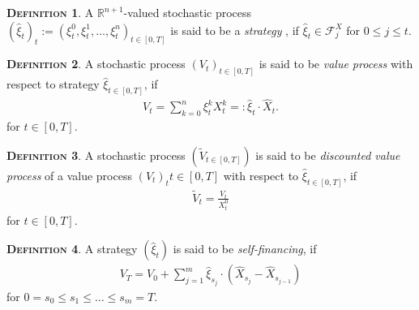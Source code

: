 \documentclass[a4paper, twoside, 11pt]{article}
\theoremstyle{definition}
\newtheorem{definition}{\scshape Definition}[section]
\begin{document}
\begin{definition}
  A $\mathbb{R}^{n+1}$-valued stochastic process $(\hat{\xi}_t)_t:=(\xi_t^0, \xi_t^1,\dots, \xi_t^n)_{t\in [0, T]}$ is said to be a \emph{strategy} , if $\hat{\xi}_t \in \mathcal{F}^X_{j}$ for $0\le j \le t$.
\end{definition}

\begin{definition}
  A stochastic process $(V_t)_{t\in[0, T]}$ is said to be \emph{value process} with respect to strategy $\hat{\xi}_{t\in [0, T]}$, if 
  \begin{eqnarray*}
	V_t = \sum_{k=0}^n \xi^k_t X^k_t =: \hat{\xi}_t\cdot\hat{X}_t.
  \end{eqnarray*}
  for $t \in [0, T]$.
\end{definition}


\begin{definition}
  A stochastic process $(\tilde{V}_{t\in[0,T]})$ is said to be \emph{discounted value process} of a value process $(V_t)_t{t\in [0, T]}$ with respect to $\hat{\xi}_{t\in [0, T]}$, if 
  \begin{eqnarray*}
	\tilde{V}_t = \frac{V_t}{X_t^0}
  \end{eqnarray*}
  for $t \in [0, T]$.
\end{definition}

\begin{definition}
  A strategy $(\hat{\xi}_t)$ is said to be \emph{self-financing}, if
  \begin{eqnarray}
	V_T = V_0 + \sum_{j=1}^m \hat{\xi}_{s_j}\cdot (\hat{X}_{s_j} - \hat{X}_{s_{j-1}}) 
	\label{sec:123}
  \end{eqnarray}
  \label{sec:def}
  for $0=s_0\le s_1\le \dots\le s_m=T$.
\end{definition}
\end{document}
